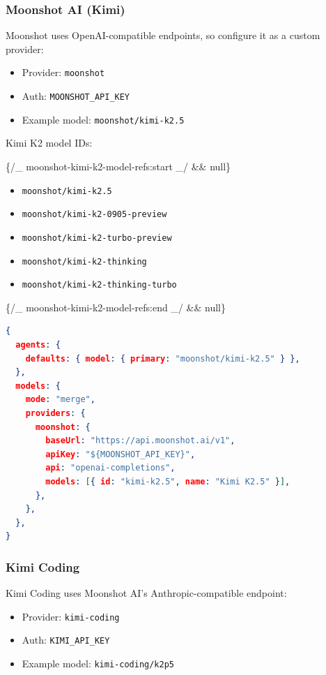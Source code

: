 \subsubsection{Moonshot AI (Kimi)}


Moonshot uses OpenAI-compatible endpoints, so configure it as a custom provider:

\begin{itemize}
  \item Provider: \texttt{moonshot}
  \item Auth: \texttt{MOONSHOT\_API\_KEY}
  \item Example model: \texttt{moonshot/kimi-k2.5}
\end{itemize}


Kimi K2 model IDs:


\{/\_ moonshot-kimi-k2-model-refs:start \_/ \&\& null\}


\begin{itemize}
  \item \texttt{moonshot/kimi-k2.5}
  \item \texttt{moonshot/kimi-k2-0905-preview}
  \item \texttt{moonshot/kimi-k2-turbo-preview}
  \item \texttt{moonshot/kimi-k2-thinking}
  \item \texttt{moonshot/kimi-k2-thinking-turbo}
\end{itemize}

\{/\_ moonshot-kimi-k2-model-refs:end \_/ \&\& null\}

\begin{lstlisting}[language=json]
{
  agents: {
    defaults: { model: { primary: "moonshot/kimi-k2.5" } },
  },
  models: {
    mode: "merge",
    providers: {
      moonshot: {
        baseUrl: "https://api.moonshot.ai/v1",
        apiKey: "${MOONSHOT_API_KEY}",
        api: "openai-completions",
        models: [{ id: "kimi-k2.5", name: "Kimi K2.5" }],
      },
    },
  },
}
\end{lstlisting}


\subsubsection{Kimi Coding}


Kimi Coding uses Moonshot AI's Anthropic-compatible endpoint:

\begin{itemize}
  \item Provider: \texttt{kimi-coding}
  \item Auth: \texttt{KIMI\_API\_KEY}
  \item Example model: \texttt{kimi-coding/k2p5}
\end{itemize}


